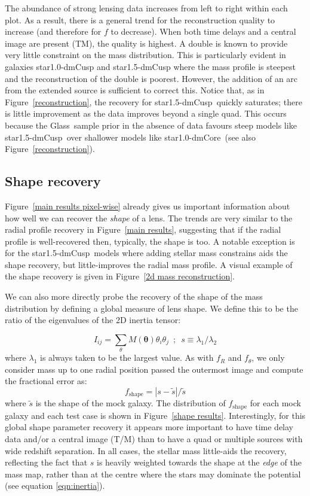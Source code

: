 \documentclass[galley,usenatbib]{mn2e}
\newcommand{\Glass}{{\sc Glass}}
\newcommand{\figref}[1] {Figure~\ref{#1}}
\renewcommand{\vec}[1]{\ensuremath{\boldsymbol{#1}}}
\newcommand{\mockAA}{{\sc star1.0-dmCore}}
\newcommand{\mockAC}{{\sc star1.0-dmCusp}}
\newcommand{\mockBC}{{\sc star1.5-dmCusp}}
\begin{document}
The abundance of strong lensing data increases from left to right within each
plot. As a result, there is a general trend for the reconstruction quality to
increase (and therefore for $f$ to decrease). When both time delays and
a central image are present (TM), the quality is highest. A double is known to
provide very little constraint on the mass distribution. This is particularly
evident in galaxies \mockAC{} and \mockBC{} where the mass profile is steepest
and the reconstruction of the double is poorest. However, the addition of an
arc from the extended source is sufficient to correct this. Notice that, as in \figref{reconstruction}, the recovery for \mockBC\ quickly saturates; there is little improvement as the data improves beyond a single quad. This occurs because the \Glass\ sample prior in the absence of data favours steep models like \mockBC\ over shallower models like \mockAA\ (see also \figref{reconstruction}). 

\subsection{Shape recovery}\label{sec:shape}

\figref{main results pixel-wise} already gives us important information about how well we can recover the {\it shape} of a lens. The trends are very similar to the radial profile recovery in \figref{main results}, suggesting that if the radial profile is well-recovered then, typically, the shape is too. A notable exception is for the \mockBC\ models where adding stellar mass constrains aids the shape recovery, but little-improves the radial mass profile. A visual example of the shape recovery is given in \figref{2d mass reconstruction}.

We can also more directly probe the recovery of the shape of the mass
distribution by defining a global measure of lens shape. We define this to be the ratio of the eigenvalues of the 2D inertia tensor: 

\begin{equation} 
I_{ij} = \sum_\theta M(\vec\theta) \theta_i\theta_j \,\,\, ; \,\,\, s \equiv \lambda_1/\lambda_2
\label{eqn:inertia}
\end{equation}
where $\lambda_1$ is always taken to be the largest value. As with $f_R$ and $f_\theta$, we only consider mass up to one radial position passed the outermost image and compute the fractional error as:
%
\begin{equation} \label{ferror shape}
  f_\mathrm{shape} = \left|s - \tilde s\right|  / \tilde s
\end{equation}
%
where $\tilde s$ is the shape of the mock galaxy. The distribution of $f_\mathrm{shape}$
for each mock galaxy and each test case is shown in \figref{shape results}. Interestingly, for this global shape parameter recovery it appears more important to have time delay data and/or a central image (T/M) than to have a quad or multiple sources with wide redshift separation. In all cases, the stellar mass little-aids the recovery, reflecting the fact that $s$ is heavily weighted towards the shape at the {\it edge} of the mass map, rather than at the centre where the stars may dominate the potential (see equation \ref{eqn:inertia}).
\end{document}
